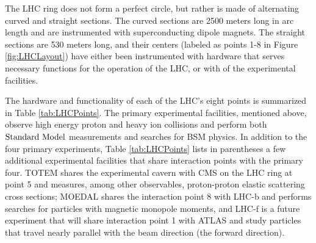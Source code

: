 The LHC ring does not form a perfect circle, but rather is made of alternating curved and straight sections. The curved sections are 2500 meters long in arc length and are instrumented with superconducting dipole magnets. The straight sections are 530 meters long, and their centers (labeled as points 1-8 in Figure \ref{fig:LHCLayout}) have either been instrumented with hardware that serves necessary functions for the operation of the LHC, or with of the experimental facilities. 

The hardware and functionality of each of the LHC's eight points is summarized in Table \ref{tab:LHCPoints}.  The primary experimental facilities, mentioned above, observe high energy proton and heavy ion collisions and perform both $\text{Standard\ Model}$ measurements and searches for BSM physics. In addition to the four primary experiments, Table \ref{tab:LHCPoints} lists in parentheses a few additional experimental facilities that share interaction points with the primary four. TOTEM shares the experimental cavern with CMS on the LHC ring at point 5 and measures, among other observables, proton-proton elastic scattering cross sections; MOEDAL shares the interaction point 8 with LHC-b and performs searches for particles with magnetic monopole moments, and LHC-f is a future experiment that will share interaction point 1 with ATLAS and study particles that travel nearly parallel with the beam direction (the forward direction).


